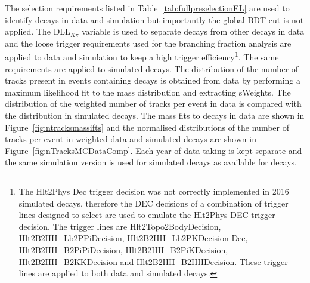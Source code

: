 The selection requirements listed in Table~\ref{tab:fullpreselectionEL} are used to identify \bdkpi decays in data and simulation but importantly the global BDT cut is not applied. The DLL$_{K\pi}$ variable is used to separate \bdkpi decays from other \bhh decays in data and the loose trigger requirements used for the branching fraction analysis are applied to data and simulation to keep a high trigger efficiency\footnote{The Hlt2Phys Dec trigger decision was not correctly implemented in 2016 simulated decays, therefore the DEC decisions of a combination of trigger lines designed to select \bhh are used to emulate the Hlt2Phys DEC trigger decision. The trigger lines are Hlt2Topo2BodyDecision, Hlt2B2HH\_Lb2PPiDecision, Hlt2B2HH\_Lb2PKDecision Dec, Hlt2B2HH\_B2PiPiDecision, Hlt2B2HH\_B2PiKDecision, Hlt2B2HH\_B2KKDecision and Hlt2B2HH\_B2HHDecision. These trigger lines are applied to both data and simulated decays.}. The same requirements are applied to simulated decays. The distribution of the number of tracks present in events containing \bdkpi decays is obtained from data by performing a maximum likelihood fit to the \bd mass distribution and extracting sWeights. The distribution of the weighted number of tracks per event in data is compared with the distribution in simulated \bdkpi decays. The mass fits to \bdkpi decays in data are shown in Figure~\ref{fig:ntracksmassifts} and the normalised distributions of the number of tracks per event in weighted data and simulated decays are shown in Figure~\ref{fig:nTracksMCDataComp}. Each year of data taking is kept separate and the same simulation version is used for \bdkpi simulated decays as available for \bsmumu decays.



